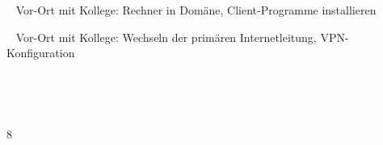 {{	\textbullet~ Vor-Ort mit Kollege: Rechner in Domäne, Client-Programme installieren\par
	\textbullet~ Vor-Ort mit Kollege: Wechseln der primären Internetleitung, VPN-Konfiguration\par
	\textbullet~ \par
	\textbullet~ 
	}{}{8}
}{}
\Unterschrift
\newpage
